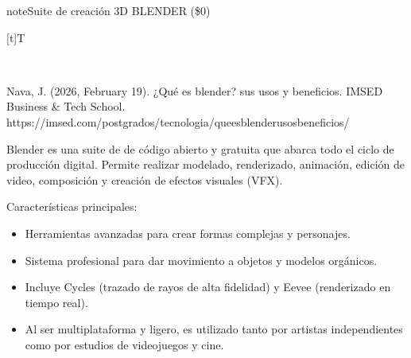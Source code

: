\documentclass[letterpaper,10pt,spanish]{sphinxmanual}
\let\sphinxpxdimen\pdfpxdimen\else\newdimen\sphinxpxdimen
\begin{document}
\begin{sphinxadmonition}{note}{Suite de creación 3D BLENDER (\$0)}


\begin{savenotes}\sphinxattablestart
\sphinxthistablewithglobalstyle
\centering
\begin{tabulary}{\linewidth}[t]{T}
\sphinxtoprule
\sphinxtableatstartofbodyhook

\begin{sphinxfigure-in-table}
\centering
\capstart
\noindent\sphinxincludegraphics[width=360\sphinxpxdimen]{{image063}.png}
\label{\detokenize{1_guias/10ofimatica/G1012:id46}}\end{sphinxfigure-in-table}\relax
\\
\sphinxbottomrule
\end{tabulary}
\sphinxtableafterendhook\par
\sphinxattableend\end{savenotes}

\sphinxAtStartPar
%
\begin{footnote}[8]\sphinxAtStartFootnote
Nava, J. (2026, February 19). ¿Qué es blender? sus usos y beneficios. IMSED Business \& Tech School. https://imsed.com/postgrados/tecnologia/que\sphinxhyphen{}es\sphinxhyphen{}blender\sphinxhyphen{}usos\sphinxhyphen{}beneficios/
%
\end{footnote} Blender es una suite de  de código abierto y gratuita que abarca todo el ciclo de producción digital. Permite realizar modelado, renderizado, animación, edición de video, composición y creación de efectos visuales (VFX).

\sphinxAtStartPar
Características principales:
\begin{itemize}
\item {} 
\sphinxAtStartPar
{} Herramientas avanzadas para crear formas complejas y personajes.

\item {} 
\sphinxAtStartPar
{} Sistema profesional para dar movimiento a objetos y modelos orgánicos.

\item {} 
\sphinxAtStartPar
{} Incluye Cycles (trazado de rayos de alta fidelidad) y Eevee (renderizado en tiempo real).

\item {} 
\sphinxAtStartPar
{} Al ser multiplataforma y ligero, es utilizado tanto por artistas independientes como por estudios de videojuegos y cine.

\end{itemize}
\end{sphinxadmonition}
\end{document}
